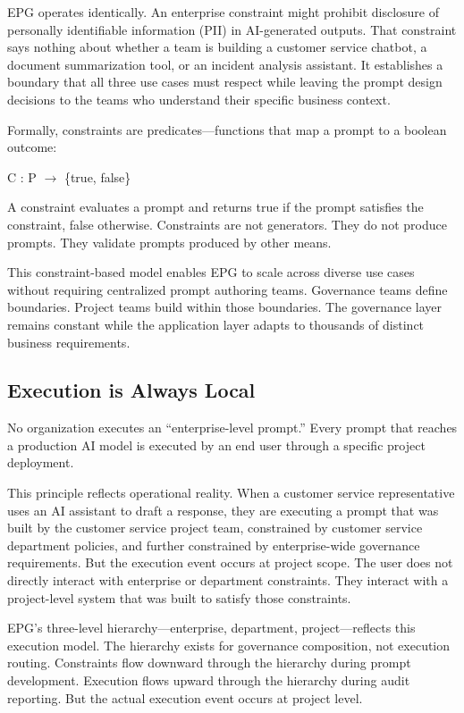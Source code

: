 EPG operates identically. An enterprise constraint might prohibit disclosure of personally identifiable information (PII) in AI-generated outputs. That constraint says nothing about whether a team is building a customer service chatbot, a document summarization tool, or an incident analysis assistant. It establishes a boundary that all three use cases must respect while leaving the prompt design decisions to the teams who understand their specific business context.

Formally, constraints are predicates---functions that map a prompt to a boolean outcome:

\begin{claddisp}
C : P $\to$ \{true, false\}
\end{claddisp}


A constraint evaluates a prompt and returns true if the prompt satisfies the constraint, false otherwise. Constraints are not generators. They do not produce prompts. They validate prompts produced by other means.

This constraint-based model enables EPG to scale across diverse use cases without requiring centralized prompt authoring teams. Governance teams define boundaries. Project teams build within those boundaries. The governance layer remains constant while the application layer adapts to thousands of distinct business requirements.

\subsection{Execution is Always Local}


No organization executes an ``enterprise-level prompt.'' Every prompt that reaches a production AI model is executed by an end user through a specific project deployment.

This principle reflects operational reality. When a customer service representative uses an AI assistant to draft a response, they are executing a prompt that was built by the customer service project team, constrained by customer service department policies, and further constrained by enterprise-wide governance requirements. But the execution event occurs at project scope. The user does not directly interact with enterprise or department constraints. They interact with a project-level system that was built to satisfy those constraints.

EPG's three-level hierarchy---enterprise, department, project---reflects this execution model. The hierarchy exists for governance composition, not execution routing. Constraints flow downward through the hierarchy during prompt development. Execution flows upward through the hierarchy during audit reporting. But the actual execution event occurs at project level.

